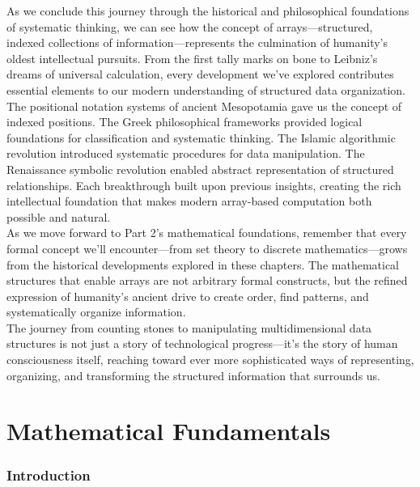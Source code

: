 \documentclass[12pt, oneside, openany]{book}
\begin{document}
As we conclude this journey through the historical and philosophical foundations of systematic thinking, we can see how the concept of arrays—structured, indexed collections of information—represents the culmination of humanity's oldest intellectual pursuits. From the first tally marks on bone to Leibniz's dreams of universal calculation, every development we've explored contributes essential elements to our modern understanding of structured data organization.\\
The positional notation systems of ancient Mesopotamia gave us the concept of indexed positions. The Greek philosophical frameworks provided logical foundations for classification and systematic thinking. The Islamic algorithmic revolution introduced systematic procedures for data manipulation. The Renaissance symbolic revolution enabled abstract representation of structured relationships. Each breakthrough built upon previous insights, creating the rich intellectual foundation that makes modern array-based computation both possible and natural.\\
As we move forward to Part 2's mathematical foundations, remember that every formal concept we'll encounter—from set theory to discrete mathematics—grows from the historical developments explored in these chapters. The mathematical structures that enable arrays are not arbitrary formal constructs, but the refined expression of humanity's ancient drive to create order, find patterns, and systematically organize information.\\
The journey from counting stones to manipulating multidimensional data structures is not just a story of technological progress—it's the story of human consciousness itself, reaching toward ever more sophisticated ways of representing, organizing, and transforming the structured information that surrounds us.
\part{Mathematical Fundamentals}
\section*{Introduction}
\end{document}
